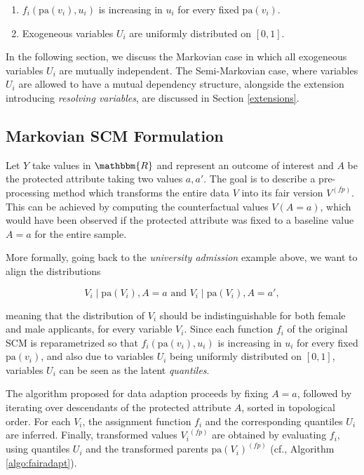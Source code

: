 \documentclass[
  nojss]{jss}
\providecommand{\tightlist}{%
  \setlength{\itemsep}{0pt}\setlength{\parskip}{0pt}}
\begin{document}
\begin{enumerate}
\def\labelenumi{(\roman{enumi})}
\tightlist
\item
  \(f_i(\mathrm{pa}(v_i), u_i)\) is increasing in \(u_i\) for every
  fixed \(\mathrm{pa}(v_i)\).
\item
  Exogeneous variables \(U_i\) are uniformly distributed on \([0, 1]\).
\end{enumerate}

In the following section, we discuss the Markovian case in which all
exogeneous variables \(U_i\) are mutually independent. The
Semi-Markovian case, where variables \(U_i\) are allowed to have a
mutual dependency structure, alongside the extension introducing
\emph{resolving variables}, are discussed in Section \ref{extensions}.

\hypertarget{markovian-scm-formulation}{%
\subsection{Markovian SCM Formulation}\label{markovian-scm-formulation}}

Let \(Y\) take values in \(\mathbbm{R}\) and represent an outcome of
interest and \(A\) be the protected attribute taking two values
\(a, a'\). The goal is to describe a pre-processing method which
transforms the entire data \(V\) into its fair version \( {V}^{(fp)}\).
This can be achieved by computing the counterfactual values
\(V(A = a)\), which would have been observed if the protected attribute
was fixed to a baseline value \(A = a\) for the entire sample.

More formally, going back to the \emph{university admission} example
above, we want to align the distributions

\[V_i \mid \mathrm{pa}(V_i), A = a \text{ and } V_i \mid \mathrm{pa}(V_i), A = a',\]

meaning that the distribution of \(V_i\) should be indistinguishable for
both female and male applicants, for every variable \(V_i\). Since each
function \(f_i\) of the original SCM is reparametrized so that
\(f_i(\mathrm{pa}(v_i), u_i)\) is increasing in \(u_i\) for every fixed
\(\mathrm{pa}(v_i)\), and also due to variables \(U_i\) being uniformly
distributed on \([0, 1]\), variables \(U_i\) can be seen as the latent
\emph{quantiles}.

The algorithm proposed for data adaption proceeds by fixing \(A = a\),
followed by iterating over descendants of the protected attribute \(A\),
sorted in topological order. For each \(V_i\), the assignment function
\(f_i\) and the corresponding quantiles \(U_i\) are inferred. Finally,
transformed values \( {V_i}^{(fp)}\) are obtained by evaluating \(f_i\),
using quantiles \(U_i\) and the transformed parents
\( {\mathrm{pa}(V_i)}^{(fp)}\) (cf., Algorithm \ref{algo:fairadapt}).
\end{document}
